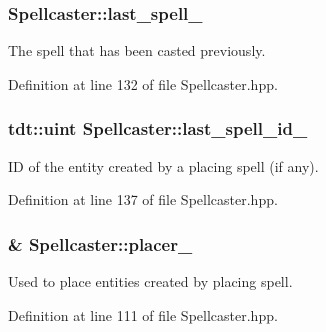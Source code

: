 \subsubsection[{\texorpdfstring{last\+\_\+spell\+\_\+}{last_spell_}}]{ Spellcaster\+::last\+\_\+spell\+\_\+\hspace{0.3cm}{\ttfamily [private]}}\hypertarget{class_spellcaster_a397320efd8c657b8e47694124ba45fd1}{}\label{class_spellcaster_a397320efd8c657b8e47694124ba45fd1}


The spell that has been casted previously. 



Definition at line 132 of file Spellcaster.\+hpp.

\subsubsection[{\texorpdfstring{last\+\_\+spell\+\_\+id\+\_\+}{last_spell_id_}}]{\setlength{\rightskip}{0pt plus 5cm}tdt\+::uint Spellcaster\+::last\+\_\+spell\+\_\+id\+\_\+\hspace{0.3cm}{\ttfamily [private]}}\hypertarget{class_spellcaster_a396c7fb9dfcf6d20086f47944e637e6f}{}\label{class_spellcaster_a396c7fb9dfcf6d20086f47944e637e6f}


ID of the entity created by a placing spell (if any). 



Definition at line 137 of file Spellcaster.\+hpp.

\subsubsection[{\texorpdfstring{placer\+\_\+}{placer_}}]{\& Spellcaster\+::placer\+\_\+\hspace{0.3cm}{\ttfamily [private]}}\hypertarget{class_spellcaster_afc71d4b4359263bbe6b5097ffdf2213d}{}\label{class_spellcaster_afc71d4b4359263bbe6b5097ffdf2213d}


Used to place entities created by placing spell. 



Definition at line 111 of file Spellcaster.\+hpp.

